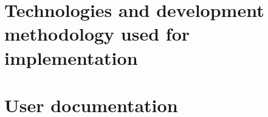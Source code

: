 \chapter{Technologies and development methodology used for implementation}
\chapter{User documentation}


